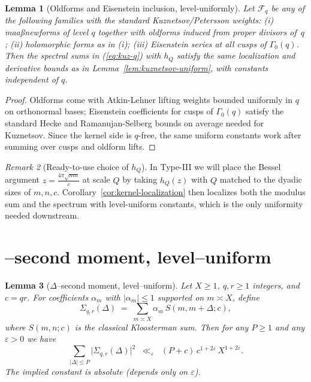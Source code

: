 \documentclass[11pt]{article}
\def\eqref#1{(\ref{#1})}%
\newtheorem{lemma}{Lemma}[part]
\theoremstyle{definition}
\theoremstyle{remark}
\newtheorem{remark}[lemma]{Remark}
\numberwithin{equation}{part}
\begin{document}
\begin{lemma}[Oldforms and Eisenstein inclusion, level-uniformly]\label{lem:old-eis-weights}
	Let $\mathcal F_q$ be any of the following families with the \emph{standard} Kuznetsov/Petersson weights: (i) maa\ss newforms of level $q$ together with oldforms induced from proper divisors of~$q$; (ii) holomorphic forms as in (i); (iii) Eisenstein series at all cusps of $\Gamma_0(q)$. Then the spectral sums in \eqref{eq:kuz-q} with $h_Q$ satisfy the same localization and derivative bounds as in Lemma~\ref{lem:kuznetsov-uniform}, with constants independent of $q$.
\end{lemma}

\begin{proof}
	Oldforms come with Atkin-Lehner lifting weights bounded uniformly in $q$ on orthonormal bases; Eisenstein coefficients for cusps of $\Gamma_0(q)$ satisfy the standard Hecke and Ramanujan-Selberg bounds on average needed for Kuznetsov. Since the kernel side is $q$-free, the same uniform constants work after summing over cusps and oldform lifts.
\end{proof}

\begin{remark}[Ready-to-use choice of $h_Q$]\label{rem:choose-hQ}
	In Type-III we will place the Bessel argument $z=\tfrac{4\pi\sqrt{mn}}{c}$ at scale $Q$ by taking $h_Q(z)$ with $Q$ matched to the dyadic sizes of $m,n,c$. Corollary~\ref{cor:kernel-localization} then localizes both the modulus sum and the spectrum with level-uniform constants, which is the only uniformity needed downstream.
\end{remark}

\section{\textbf\textDelta--second moment, level--uniform}

\begin{lemma}[{\boldmath $\Delta$--second moment, level--uniform}]
	\label{lem:delta-second-moment}
	Let $X \ge 1$, $q,r \ge 1$ integers, and $c=qr$.
	For coefficients $\alpha_m$ with $|\alpha_m|\le 1$ supported on $m\asymp X$, define
	\[
		\Sigma_{q,r}(\Delta) \;=\; \sum_{m\asymp X} \alpha_m \, S(m,m+\Delta;c),
	\]
	where $S(m,n;c)$ is the classical Kloosterman sum. Then for any $P\ge 1$ and any $\varepsilon>0$ we have
	\[
		\sum_{|\Delta|\le P} \bigl|\Sigma_{q,r}(\Delta)\bigr|^2
		\;\;\ll_{\varepsilon}\;\; (P+c)\,c^{1+2\varepsilon}\,X^{1+2\varepsilon}.
	\]
	The implied constant is absolute (depends only on $\varepsilon$).
\end{lemma}
\end{document}
